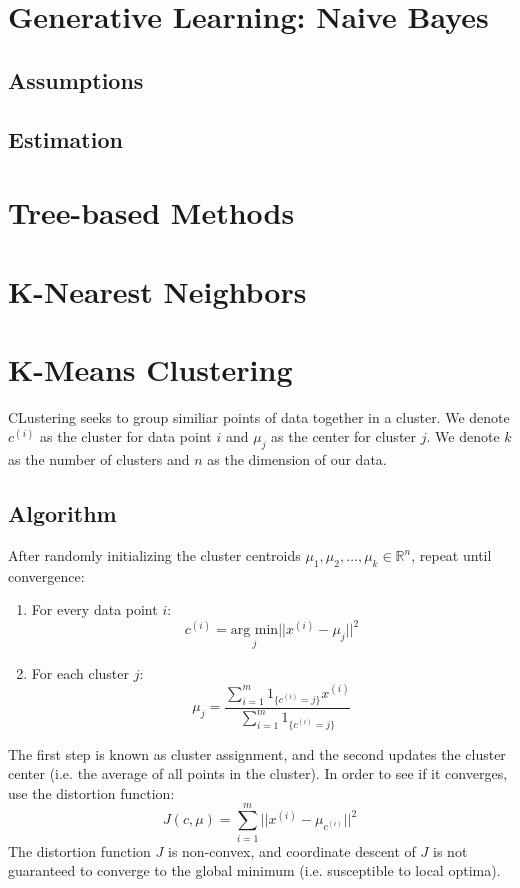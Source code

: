 \documentclass[twoside,twocolumn]{article}
\begin{document}
\section{Generative Learning: Naive Bayes}
\subsection{Assumptions}
\subsection{Estimation}
\section{Tree-based Methods}
\section{K-Nearest Neighbors}
\section{K-Means Clustering}
CLustering seeks to group similiar points of data together in a cluster. We
denote $c^{(i)}$ as the cluster for data point $i$ and $\mu_j$ as the center
for cluster $j$. We denote $k$ as the number of clusters and $n$ as the
dimension of our data.
\subsection{Algorithm}
After randomly initializing the cluster centroids
$\mu_1, \mu_2, \hdots, \mu_k \in \mathbb{R}^n$, repeat until convergence:
\begin{enumerate}
  \item For every data point $i$:
    \begin{equation}
      c^{(i)}=\underset{j}{\textrm{arg min}}||x^{(i)}-\mu_j||^2
    \end{equation}
  \item For each cluster $j$:
    \begin{equation}
      \mu_j=\frac{\displaystyle\sum_{i=1}^m1_{\{c^{(i)}=j\}}x^{(i)}}{\displaystyle\sum_{i=1}^m1_{\{c^{(i)}=j\}}}
    \end{equation}
\end{enumerate}
The first step is known as cluster assignment, and the second updates the
cluster center (i.e. the average of all points in the cluster). In order to
see if it converges, use the distortion function:
\begin{equation}
  J(c,\mu)=\sum_{i=1}^m||x^{(i)}-\mu_{c^{(i)}}||^2
\end{equation}
The distortion function $J$ is non-convex, and coordinate descent of $J$ is not
guaranteed to converge to the global minimum (i.e. susceptible to local optima).
\end{document}
